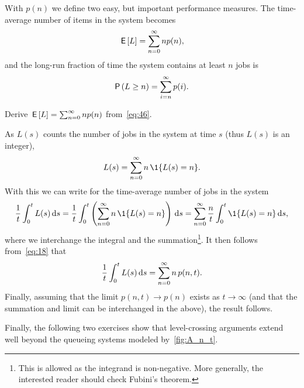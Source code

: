 With $p(n)$ we define two easy, but important performance measures.
The time-average number of items in the system becomes
\begin{equation*}
\,\mathsf{E}\left[L\right] = \sum_{n=0}^\infty n p(n),
\end{equation*}
and the long-run fraction of time the system contains at least $n$ jobs is
\begin{equation*}
 \P{ L \geq n} = \sum_{i=n}^\infty p(i).
\end{equation*}

\begin{exercise}
 Derive $\,\mathsf{E}\left[L\right] = \sum_{n=0}^\infty n p(n)$ from~\cref{eq:46}. 
\begin{solution}
As $L(s)$ counts the number of jobs in the system at time $s$ (thus $L(s)$ is an integer),
\begin{equation*}
 L(s) = \sum_{n=0}^\infty n\, \1{L(s) = n}.
\end{equation*}
With this we can write for the time-average number of jobs in the system
\begin{equation}\label{eq:1}
\frac 1 t \int_0^t L(s) \d s = \frac 1 t \int_0^t \left(\sum_{n=0}^{\infty} n\, \1{L(s) = n}\right) \d s
= \sum_{n=0}^{\infty} \frac n t \int_0^t \1{L(s) = n} \d s,
\end{equation}
where we interchange the integral and the summation\footnote{This is allowed as the integrand is non-negative.
 More generally, the interested reader should check Fubini's theorem.}.
It then follows from~\cref{eq:18} that
\begin{equation*}
\frac 1 t \int_0^t L(s) \,\text{d}s = \sum_{n=0}^{\infty} n\, p(n,t).
\end{equation*}
Finally, assuming that the limit $p(n,t) \to p(n)$ exists as
$t\to\infty$ (and that the summation and limit can be interchanged in
the above), the result follows.
\end{solution}
\end{exercise}






Finally, the following two exercises show that level-crossing arguments extend well beyond the queueing systems modeled by~\cref{fig:A_n_t}.

